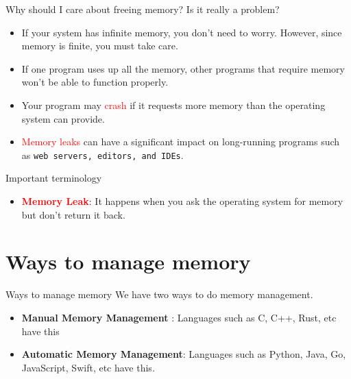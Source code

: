 \documentclass[
  10pt,
  ignorenonframetext,
]{beamer}
\providecommand{\tightlist}{%
  \setlength{\itemsep}{0pt}\setlength{\parskip}{0pt}}
\begin{document}
\begin{frame}{Why should I care about freeing
memory? Is it really a problem?}
\protect\hypertarget{why-should-i-care-about-freeing-memory-is-it-really-a-problem}{}
\pause

\begin{itemize}
\tightlist
\item
  If your system has infinite memory, you don't
  need to worry. However, since memory is finite,
  you must take care. \pause
\item
  If one program uses up all the memory, other
  programs that require memory won't be able to
  function properly. \pause
\item
  Your program may \textcolor{red}{crash} if it
  requests more memory than the operating system
  can provide. \pause
\item
  \textcolor{red}{Memory leaks} can have a
  significant impact on long-running programs such
  as \texttt{web servers, editors, and IDEs}.
\end{itemize}

\pause

\begin{block}{Important terminology}
\protect\hypertarget{important-terminology}{}
\begin{itemize}
\tightlist
\item
  \textbf{\textcolor{red}{Memory Leak}}: It
  happens when you ask the operating system for
  memory but don't return it back.
\end{itemize}
\end{block}
\end{frame}

\hypertarget{ways-to-manage-memory}{%
\section{Ways to manage
memory}\label{ways-to-manage-memory}}

\begin{frame}{Ways to manage memory}
We have two ways to do memory management.

\pause

\begin{itemize}
\tightlist
\item
  \textbf{Manual Memory Management} : Languages
  such as C, C++, Rust, etc have this
\end{itemize}

\pause

\begin{itemize}
\tightlist
\item
  \textbf{Automatic Memory Management}: Languages
  such as Python, Java, Go, JavaScript, Swift, etc
  have this.
\end{itemize}
\end{frame}
\end{document}
